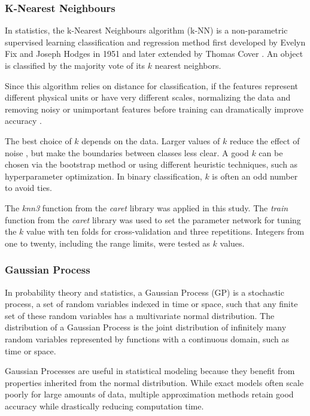 \let\LaTeXcline\cline\documentclass[sn-mathphys-num]{sn-jnl}\let\cline\LaTeXcline
\begin{document}
\subsubsection{K-Nearest Neighbours}

In statistics, the k-Nearest Neighbours algorithm (k-NN) is a non-parametric supervised learning classification and regression method first developed by Evelyn Fix and Joseph Hodges in 1951 \cite{Fix1989} and later extended by Thomas Cover \cite{Cover1967}. An object is classified by the majority vote of its $k$ nearest neighbors.

Since this algorithm relies on distance for classification, if the features represent different physical units or have very different scales, normalizing the data and removing noisy or unimportant features before training can dramatically improve accuracy \cite{Hastie2009}.
 
The best choice of $k$ depends on the data. Larger values of $k$ reduce the effect of noise \cite{Everitt2011}, but make the boundaries between classes less clear. A good $k$ can be chosen via the bootstrap method \cite{Hall2008} or using different heuristic techniques, such as hyperparameter optimization. In binary classification, $k$ is often an odd number to avoid ties.

The \textit{knn3} function from the \textit{caret} library \cite{Kuhn2007} was applied in this study. The \textit{train} function from the \textit{caret} library \cite{Kuhn2007} was used to set the parameter network for tuning the $k$ value with ten folds for cross-validation and three repetitions. Integers from one to twenty, including the range limits, were tested as $k$ values.

\subsubsection{Gaussian Process}

In probability theory and statistics, a Gaussian Process (GP) is a stochastic process, a set of random variables indexed in time or space, such that any finite set of these random variables has a multivariate normal distribution. The distribution of a Gaussian Process is the joint distribution of infinitely many random variables represented by functions with a continuous domain, such as time or space.

Gaussian Processes are useful in statistical modeling because they benefit from properties inherited from the normal distribution. While exact models often scale poorly for large amounts of data, multiple approximation methods retain good accuracy while drastically reducing computation time.
  
\end{document}

